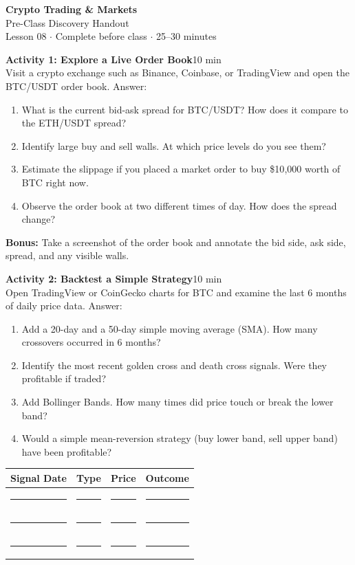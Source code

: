 \documentclass[11pt,a4paper]{article}
\newcommand{\activitybox}[3]{%
  \noindent\colorbox{mllavender4}{\parbox{\dimexpr\linewidth-2\fboxsep}{%
    \textbf{\color{mlpurple}#1}\hfill\textcolor{mlgray}{\small #2}\\[2pt]#3%
  }}\par\vspace{4pt}%
}
\newcommand{\fillcell}{\rule{2.2cm}{0.3pt}}
\begin{document}
\begin{center}
{\LARGE\color{mlpurple}\textbf{Crypto Trading \& Markets}}\\[4pt]
{\large\color{mlblue}Pre-Class Discovery Handout}\\[2pt]
{\small\color{mlgray}Lesson 08 $\cdot$ Complete before class $\cdot$ 25--30 minutes}
\end{center}
\vspace{4pt}

\activitybox{Activity 1: Explore a Live Order Book}{10 min}{%
Visit a crypto exchange such as Binance, Coinbase, or TradingView and open the BTC/USDT order book. Answer:
\begin{enumerate}
\item What is the current bid-ask spread for BTC/USDT? How does it compare to the ETH/USDT spread?
\item Identify large buy and sell walls. At which price levels do you see them?
\item Estimate the slippage if you placed a market order to buy \$10{,}000 worth of BTC right now.
\item Observe the order book at two different times of day. How does the spread change?
\end{enumerate}
\textbf{Bonus:} Take a screenshot of the order book and annotate the bid side, ask side, spread, and any visible walls.
}

\vspace{2pt}

\activitybox{Activity 2: Backtest a Simple Strategy}{10 min}{%
Open TradingView or CoinGecko charts for BTC and examine the last 6 months of daily price data. Answer:
\begin{enumerate}
\item Add a 20-day and a 50-day simple moving average (SMA). How many crossovers occurred in 6 months?
\item Identify the most recent golden cross and death cross signals. Were they profitable if traded?
\item Add Bollinger Bands. How many times did price touch or break the lower band?
\item Would a simple mean-reversion strategy (buy lower band, sell upper band) have been profitable?
\end{enumerate}
\vspace{4pt}
{\footnotesize\renewcommand{\arraystretch}{1.35}%
\setlength{\tabcolsep}{5pt}%
\begin{tabular}{@{}llll@{}}
\toprule
\textbf{Signal Date} & \textbf{Type} & \textbf{Price} & \textbf{Outcome} \\
\midrule
\fillcell & \fillcell & \fillcell & \fillcell \\
\fillcell & \fillcell & \fillcell & \fillcell \\
\fillcell & \fillcell & \fillcell & \fillcell \\
\bottomrule
\end{tabular}}
\vspace{2pt}
}
\end{document}
